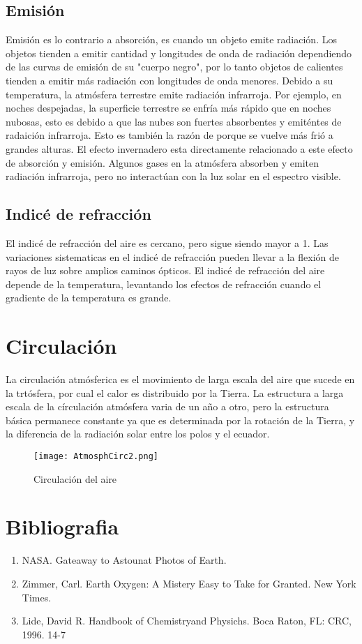 \documentclass{article}
\begin{document}
\subsection {Emisión}
Emisión es lo contrario a absorción, es cuando un objeto emite radiación. Los objetos tienden a emitir cantidad y longitudes de onda de radiación dependiendo de las curvas de emisión de su "cuerpo negro", por lo tanto objetos de calientes tienden a emitir más radiación con longitudes de onda menores.
Debido a su temperatura, la atmósfera terrestre emite radiación infrarroja. Por ejemplo, en noches despejadas, la superficie terrestre se enfría más rápido que en noches nubosas, esto es debido a que las nubes son fuertes absorbentes y emiténtes de radaición infrarroja. Esto es también la razón de porque se vuelve más frió a grandes alturas.
El efecto invernadero esta directamente relacionado a este efecto de absorción y emisión. Algunos gases en la atmósfera absorben y emiten radiación infrarroja, pero no interactúan con la luz solar en el espectro visible.

\subsection {Indicé de refracción}
El indicé de refracción del aire es cercano, pero sigue siendo mayor a 1. Las variaciones sistematicas en el indicé de refracción pueden llevar a la flexión de rayos de luz sobre amplios caminos ópticos.
El indicé de refracción del aire depende de la temperatura, levantando los efectos de refracción cuando el gradiente de la temperatura es grande.

\section {Circulación}
La circulación atmósferica es el movimiento de larga escala del aire que sucede en la trtósfera, por cual el calor es distribuido por la Tierra. La estructura a larga escala de la círculación atmósfera varia de un año a otro, pero la estructura básica permanece constante ya que es determinada por la rotación de la Tierra, y la diferencia de la radiación solar entre los polos y el ecuador.

\begin{figure}
    \caption{Circulación del aire}
    \texttt{[image: AtmosphCirc2.png]}
    \centering
    \label{Circulacion}
\end{figure}

\section {Bibliografia}
\begin {enumerate}
\item NASA. Gateaway to Astounat Photos of Earth.
\item Zimmer, Carl. Earth Oxygen: A Mistery Easy to Take for Granted. New York Times.
\item Lide, David R. Handbook of Chemistryand Physichs. Boca Raton, FL: CRC, 1996. 14-7

\end{enumerate}
\end{document}
